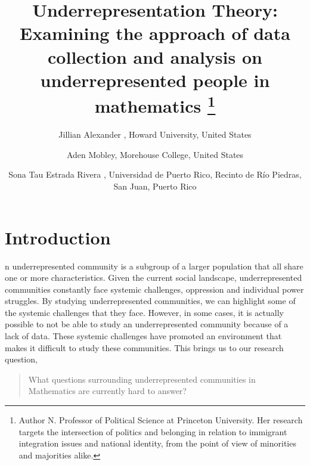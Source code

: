 \documentclass[autowc]{CUP-JNL-PPS}
\begin{document}
\begin{Frontmatter}
\title[Underrepresentation Theory]{
Underrepresentation Theory: Examining the approach of data collection and analysis on underrepresented people in mathematics
\thanks{
    Author N.  Professor of Political Science at Princeton University.
    Her research targets the intersection of politics and belonging in relation to immigrant integration issues and national identity, from the point of view of minorities and majorities alike.
}
}

\author{Jillian Alexander , Howard University, United States}
\author{Aden Mobley, Morehouse College, United States}
\author{Sona Tau Estrada Rivera , Universidad de Puerto Rico, Recinto de R\'{i}o Piedras, San Juan, Puerto Rico}


\end{Frontmatter}

\onecolumn{}

\section{Introduction}

n underrepresented community is a subgroup of a larger population that all share one or more characteristics.
Given the current social landscape, underrepresented communities constantly face systemic challenges, oppression and individual power struggles.
By studying underrepresented communities, we can highlight some of the systemic challenges that they face.
However, in some cases, it is actually possible to not be able to study an underrepresented community because of a lack of data.
These systemic challenges have promoted an environment that makes it difficult to study these communities.
This brings us to our research question,
\begin{quote}
    What questions surrounding underrepresented communities in Mathematics are currently hard to answer?
\end{quote}
\end{document}
